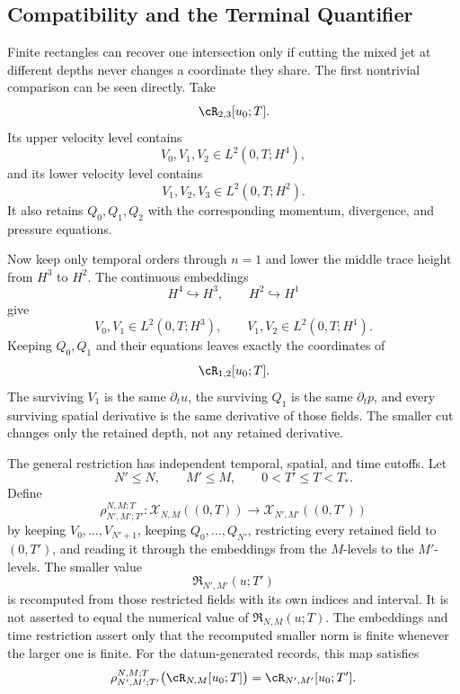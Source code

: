 
\subsection{Compatibility and the Terminal Quantifier}\label{sub:CompatibilityAndTheTerminalQuantifier}

Finite rectangles can recover one intersection only if cutting the mixed jet at different depths never changes a coordinate they share.
The first nontrivial comparison can be seen directly.
Take
\[
  \cR_{2,3}[u_0;T].
\]
Its upper velocity level contains
\[
  V_0,V_1,V_2
  \in
  L^2(0,T;H^4),
\]
and its lower velocity level contains
\[
  V_1,V_2,V_3
  \in
  L^2(0,T;H^2).
\]
It also retains \(Q_0,Q_1,Q_2\) with the corresponding momentum, divergence, and pressure equations.

Now keep only temporal orders through \(n=1\) and lower the middle trace height from \(H^3\) to \(H^2\).
The continuous embeddings
\[
  H^4\hookrightarrow H^3,
  \qquad
  H^2\hookrightarrow H^1
\]
give
\[
  V_0,V_1
  \in
  L^2(0,T;H^3),
  \qquad
  V_1,V_2
  \in
  L^2(0,T;H^1).
\]
Keeping \(Q_0,Q_1\) and their equations leaves exactly the coordinates of
\[
  \cR_{1,2}[u_0;T].
\]
The surviving \(V_1\) is the same \(\partial_tu\), the surviving \(Q_1\) is the same \(\partial_tp\), and every surviving spatial derivative is the same derivative of those fields.
The smaller cut changes only the retained depth, not any retained derivative.

The general restriction has independent temporal, spatial, and time cutoffs.
Let
\[
  N'\le N,
  \qquad
  M'\le M,
  \qquad
  0<T'\le T<T_*.
\]
Define
\[
  \rho_{N',M';T'}^{N,M;T}:
  \mathscr X_{N,M}((0,T))
  \longrightarrow
  \mathscr X_{N',M'}((0,T'))
\]
by keeping \(V_0,\ldots,V_{N'+1}\), keeping \(Q_0,\ldots,Q_{N'}\), restricting every retained field to \((0,T')\), and reading it through the embeddings from the \(M\)-levels to the \(M'\)-levels.
The smaller value
\[
  \mathfrak R_{N',M'}(u;T')
\]
is recomputed from those restricted fields with its own indices and interval.
It is not asserted to equal the numerical value of \(\mathfrak R_{N,M}(u;T)\).
The embeddings and time restriction assert only that the recomputed smaller norm is finite whenever the larger one is finite.
For the datum-generated records, this map satisfies
\[
  \rho_{N',M';T'}^{N,M;T}
  \bigl(\cR_{N,M}[u_0;T]\bigr)
  =
  \cR_{N',M'}[u_0;T'].
\]

